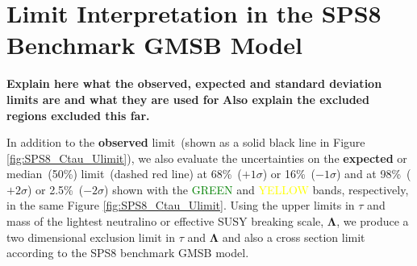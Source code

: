 \section{Limit Interpretation in the SPS8 Benchmark GMSB Model}
\textbf{Explain here what the observed, expected and standard deviation limits are and what they are used for}
\newline
\textbf{Also explain the excluded regions excluded this far.}
\par 
In addition to the \textbf{observed} limit~(shown as a solid black line in Figure \ref{fig:SPS8_Ctau_Ulimit}), we also evaluate the uncertainties on the \textbf{expected} or median~(50\%) limit~(dashed red line) at 68\%~($+ 1\sigma$) or 16\%~($- 1\sigma$) and at 98\%~($+ 2\sigma$) or 2.5\%~($- 2\sigma$) shown with the \textcolor{green}{GREEN} and \textcolor{yellow}{YELLOW}  bands, respectively, in the same Figure \ref{fig:SPS8_Ctau_Ulimit}.
\newline
Using  the upper limits in $\tau$ and mass of the lightest neutralino or effective SUSY breaking scale, $\mathbf{\Lambda}$, we produce a two dimensional exclusion limit in $\tau$ and $\mathbf{\Lambda}$ and also a cross section limit according to the SPS8 benchmark GMSB model. 
